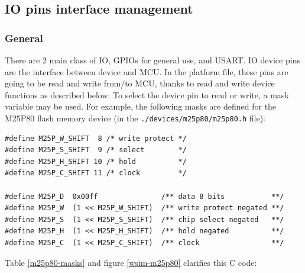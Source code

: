 \documentclass[a4paper,10pt]{report}
\begin{document}
\subsection{IO pins interface management}
\subsubsection{General}
There are 2 main class of IO, GPIOs for general use, and USART. IO device pins are the interface between device and MCU. In the platform file, these pins are going to be read and write from/to MCU, thanks to read and write device functions as described below. To select the device pin to read or write, a mask variable may be used. For example, the following masks are defined for the M25P80 flash memory device (in the \verb$./devices/m25p80/m25p80.h$ file):

\begin{verbatim}
#define M25P_W_SHIFT  8 /* write protect */
#define M25P_S_SHIFT  9 /* select        */
#define M25P_H_SHIFT 10 /* hold          */
#define M25P_C_SHIFT 11 /* clock         */

#define M25P_D  0x00ff               /** data 8 bits           **/
#define M25P_W  (1 << M25P_W_SHIFT)  /** write protect negated **/
#define M25P_S  (1 << M25P_S_SHIFT)  /** chip select negated   **/
#define M25P_H  (1 << M25P_H_SHIFT)  /** hold negated          **/
#define M25P_C  (1 << M25P_C_SHIFT)  /** clock                 **/
\end{verbatim}

\medskip
Table \ref{m25p80-masks} and figure \ref{wsim-m25p80} clarifies this C code:
\end{document}
